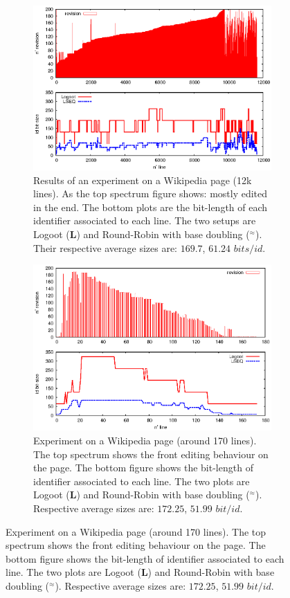 \begin{figure}
\centering
\begin{subfigure}{0.47\textwidth}
  \includegraphics[width=\textwidth]{img/poste.eps}
  \caption{Results of an experiment on a Wikipedia page (12k lines). As the top
    spectrum figure shows: mostly edited in the end. The bottom plots are the
    bit-length of each identifier associated to each line. The two setups are
    Logoot (\textbf{L}) and Round-Robin with base doubling
    (\textbf{\NAME{}}$^\approx$). Their respective average sizes are: $169.7$,
    $61.24$ $bits/id$.}
  \label{im:poste}
\end{subfigure}
\begin{subfigure}{0.47\textwidth}
\includegraphics[width=\textwidth]{img/didyouknow.eps}
  \caption{Experiment on a Wikipedia page (around 170 lines). The top spectrum
    shows the front editing behaviour on the page. The bottom figure shows the
    bit-length of identifier associated to each line. The two plots are Logoot
    (\textbf{L}) and Round-Robin with base doubling
    (\textbf{\NAME{}}$^\approx$). Respective average sizes are: $172.25$,
    $51.99$ $bit/id$.}
\label{im:didyouknow}
\end{subfigure}
\end{figure}

